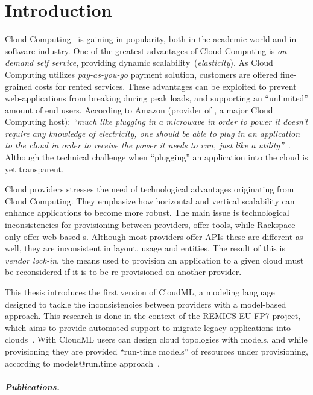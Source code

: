 \chapter{Introduction}

Cloud Computing~\cite{Armbrust:EECS-2009-28} is gaining in popularity,
both in the academic world and in software industry.
One of the greatest advantages of Cloud Computing is \emph{on-demand self service},
providing dynamic scalability~(\emph{elasticity}).
As Cloud Computing utilizes \emph{pay-as-you-go} payment solution,
customers are offered fine-grained costs for rented services.
These advantages can be exploited to prevent web-applications
from breaking during peak loads, and supporting an ``unlimited''
amount of end users.
According to Amazon (provider of , a major Cloud Computing host):
\emph{``much like plugging in a microwave
in order to power it doesn't require any knowledge of electricity,
one should be able to plug in an application to the cloud in order
to receive the power it needs to run, 
just like a utility''}~\cite{aws:varia10}.
Although the technical challenge when ``plugging'' an application into the cloud
is yet transparent.

Cloud providers stresses the need of technological advantages originating from Cloud Computing.
They emphasize how horizontal and vertical scalability can enhance applications
to become more robust.
The main issue is technological inconsistencies for provisioning between providers,
\eg {} offer  tools, while Rackspace only offer web-based s.
Although most providers offer APIs these are different as well, 
they are inconsistent in layout, usage and entities.
The result of this is \emph{vendor lock-in}, the means used to provision an application to
a given cloud must be reconsidered if it is to be re-provisioned on another provider.

This thesis introduces the first version of CloudML,
a modeling language designed to tackle the inconsistencies between providers
with a model-based approach.
This research is done in the context of the REMICS EU FP7 project,
which aims to provide automated support to migrate legacy applications into
clouds~\cite{DBLP:conf/services/MohagheghiS11}.
With CloudML users can design cloud topologies with models,
and while provisioning they are provided ``run-time models'' of 
resources under provisioning,
according to models@run.time approach~\cite{DBLP:journals/dagstuhl-reports/AssmannBCF11}.

\paragraph{Publications.}

